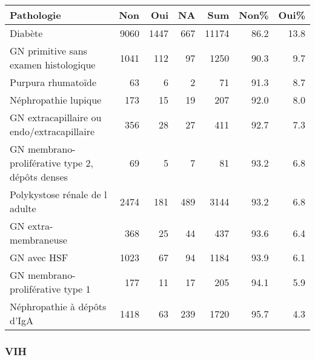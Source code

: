 \documentclass[11pt,a4paper]{article}\usepackage[]{graphicx}\usepackage[]{color}
\begin{document}
\begin{table}[H]
\centering
\begin{tabular}{lrrrrrr}
  \hline
Pathologie & Non & Oui & NA & Sum & Non\% & Oui\% \\ 
  \hline
Diabète & 9060 & 1447 & 667 & 11174 & 86.2 & 13.8 \\ 
  GN primitive sans examen histologique & 1041 & 112 & 97 & 1250 & 90.3 & 9.7 \\ 
  Purpura rhumatoïde & 63 &  6 &  2 & 71 & 91.3 & 8.7 \\ 
  Néphropathie lupique & 173 & 15 & 19 & 207 & 92.0 & 8.0 \\ 
  GN extracapillaire ou endo/extracapillaire & 356 & 28 & 27 & 411 & 92.7 & 7.3 \\ 
  GN membrano-proliférative type 2, dépôts denses & 69 &  5 &  7 & 81 & 93.2 & 6.8 \\ 
  Polykystose rénale de l adulte & 2474 & 181 & 489 & 3144 & 93.2 & 6.8 \\ 
  GN extra-membraneuse & 368 & 25 & 44 & 437 & 93.6 & 6.4 \\ 
  GN avec HSF & 1023 & 67 & 94 & 1184 & 93.9 & 6.1 \\ 
  GN membrano-proliférative type 1 & 177 & 11 & 17 & 205 & 94.1 & 5.9 \\ 
  Néphropathie à dépôts d'IgA & 1418 & 63 & 239 & 1720 & 95.7 & 4.3 \\ 
   \hline
\end{tabular}
\end{table}


\subsubsection*{VIH}
\end{document}

